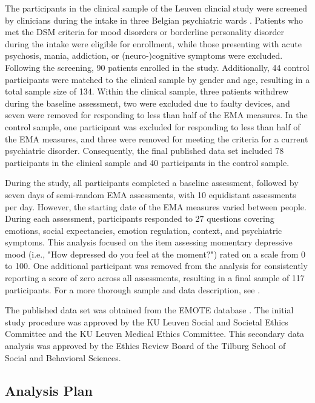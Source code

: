 \documentclass[man, floatsintext]{apa7}
\begin{document}
The participants in the clinical sample of the Leuven clincial study were
screened by clinicians during the intake
in three Belgian psychiatric wards \parencite{heininga_dynamical_2019}.
Patients who met the DSM
criteria for mood disorders or borderline personality disorder during the
intake were eligible for enrollment, while those presenting with acute
psychosis, mania, addiction, or (neuro-)cognitive symptoms were excluded.
Following the screening, 90 patients enrolled in the study. Additionally, 44
control participants were matched to the clinical sample by gender and age,
resulting in a total sample size of 134.
Within the clinical sample, three patients withdrew during the baseline
assessment, two were excluded due to faulty devices, and seven were removed for
responding to less than half of the EMA measures. In the control sample, one
participant was excluded for responding to less than half of the EMA measures,
and three were removed for meeting the criteria for a current psychiatric
disorder. Consequently, the final published data set included 78 participants
in the clinical sample and 40 participants in the control sample.

During the study, all participants completed a baseline assessment, followed by
seven days of semi-random EMA assessments, with 10 equidistant assessments per
day. However, the starting date of the EMA measures varied between people.
During each assessment, participants responded to 27 questions covering
emotions, social expectancies, emotion regulation, context, and psychiatric
symptoms. This analysis focused on the item assessing momentary depressive mood
(i.e., "How depressed do you feel at the moment?") rated on a scale from 0 to
100. One additional participant was removed from the analysis for consistently
reporting a score of zero across all assessments, resulting in a final sample
of 117 participants. For a more thorough sample and data description, see
\textcite{heininga_dynamical_2019}.

The published data set was obtained from the EMOTE database
\parencite{kalokerinos_emote_nodate}. The initial study
procedure was approved by the KU Leuven Social and Societal Ethics Committee
and the KU Leuven Medical Ethics Committee. This secondary data analysis was
approved by the Ethics Review Board of the Tilburg School of Social and
Behavioral Sciences.

\subsection{Analysis Plan}
\end{document}
